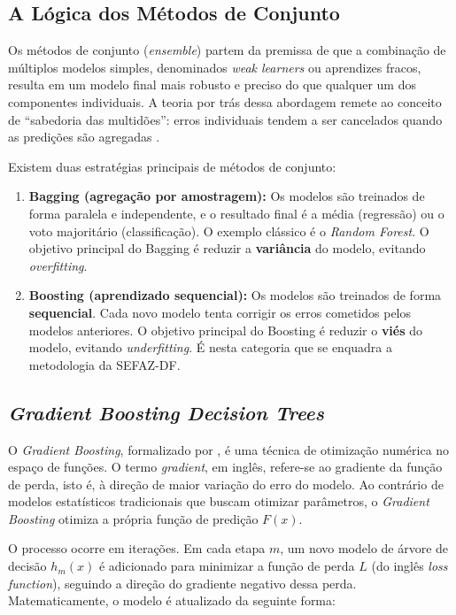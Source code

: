 \subsection{A Lógica dos Métodos de Conjunto}
Os métodos de conjunto (\textit{ensemble}) partem da premissa de que a combinação de múltiplos modelos simples, denominados \textit{weak learners} ou aprendizes fracos, resulta em um modelo final mais robusto e preciso do que qualquer um dos componentes individuais. A teoria por trás dessa abordagem remete ao conceito de ``sabedoria das multidões'': erros individuais tendem a ser cancelados quando as predições são agregadas \cite{hastieElementsStatisticalLearning2009}.

Existem duas estratégias principais de métodos de conjunto:
\begin{enumerate}
    \item \textbf{Bagging (agregação por amostragem):} Os modelos são treinados de forma paralela e independente, e o resultado final é a média (regressão) ou o voto majoritário (classificação). O exemplo clássico é o \textit{Random Forest}. O objetivo principal do Bagging é reduzir a \textbf{variância} do modelo, evitando \textit{overfitting}.

    \item \textbf{Boosting (aprendizado sequencial):} Os modelos são treinados de forma \textbf{sequencial}. Cada novo modelo tenta corrigir os erros cometidos pelos modelos anteriores. O objetivo principal do Boosting é reduzir o \textbf{viés} do modelo, evitando \textit{underfitting}. É nesta categoria que se enquadra a metodologia da SEFAZ-DF.
\end{enumerate}



\subsection{\textit{Gradient Boosting Decision Trees}}
O \textit{Gradient Boosting}, formalizado por , é uma técnica de otimização numérica no espaço de funções. O termo \textit{gradient}, em inglês, refere-se ao gradiente da função de perda, isto é, à direção de maior variação do erro do modelo. Ao contrário de modelos estatísticos tradicionais que buscam otimizar parâmetros, o \textit{Gradient Boosting} otimiza a própria função de predição $F(x)$.

O processo ocorre em iterações. Em cada etapa $m$, um novo modelo de árvore de decisão $h_m(x)$ é adicionado para minimizar a função de perda $L$ (do inglês \textit{loss function}), seguindo a direção do gradiente negativo dessa perda. Matematicamente, o modelo é atualizado da seguinte forma:

